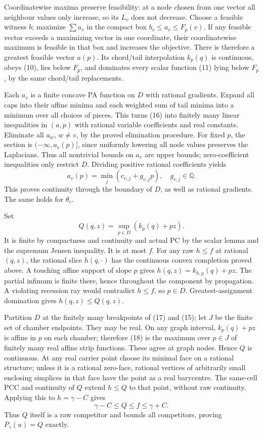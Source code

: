 \documentclass[
  11pt,
]{article}
\begin{document}
Coordinatewise maxima preserve feasibility: at a node chosen from one
vector all neighbour values only increase, so its \(L_v\) does not
decrease. Choose a feasible witness \(b\); maximize \(\sum a_v\) in the
compact box \(b_v\leq a_v\leq F_p(v)\). If any feasible vector exceeds a
maximizing vector in one coordinate, their coordinatewise maximum is
feasible in that box and increases the objective. There is therefore a
greatest feasible vector \(a(p)\). Its chord/tail interpolation
\(k_p(q)\) is continuous, obeys (10), lies below \(F_p\), and dominates
every scalar function (11) lying below \(F_p\), by the same chord/tail
replacements.

Each \(a_v\) is a finite concave PA function on \(D\) with rational
gradients. Expand all caps into their affine minima and each weighted
sum of tail minima into a minimum over all choices of pieces. This turns
(16) into finitely many linear inequalities in \((a,p)\) with rational
variable coefficients and real constants. Eliminate all \(a_w\),
\(w\ne v\), by the proved elimination procedure. For fixed \(p\), the
section is \((-\infty,a_v(p)]\), since uniformly lowering all node
values preserves the Laplacians. Thus all nontrivial bounds on \(a_v\)
are upper bounds; zero-coefficient inequalities only restrict \(D\).
Dividing positive rational coefficients yields \[
                       a_v(p)=\min_j(c_{v,j}+g_{v,j}p),\quad
                       g_{v,j}\in\mathbb{Q}.                 \tag{17}
\] This proves continuity through the boundary of \(D\), as well as
rational gradients. The same holds for \(\theta_e\).

Set \[
                            Q(q,z)=\sup_{p\in D}(k_p(q)+pz).             \tag{18}
\] It is finite by compactness and continuity and actual PC by the
scalar lemma and the supremum Jensen inequality. It is at most \(f\).
For any raw \(h\leq f\) at rational \((q,z)\), the rational slice
\(h(q,\cdot)\) has the continuous convex completion proved above. A
touching affine support of slope \(p\) gives \(h(q,z)=k_{h,p}(q)+pz\).
The partial infimum is finite there, hence throughout the component by
propagation. A violating recession ray would contradict \(h\leq f\), so
\(p\in D\). Greatest-assignment domination gives \(h(q,z)\leq Q(q,z)\).

Partition \(D\) at the finitely many breakpoints of (17) and (15); let
\(J\) be the finite set of chamber endpoints. They may be real. On any
graph interval, \(k_p(q)+pz\) is affine in \(p\) on each chamber;
therefore (18) is the maximum over \(p\in J\) of finitely many real
affine strip functions. These agree at graph nodes. Hence \(Q\) is
continuous. At any real carrier point choose its minimal face on a
rational structure; unless it is a rational zero-face, rational vertices
of arbitrarily small enclosing simplices in that face have the point as
a real barycentre. The same-cell PCC and continuity of \(Q\) extend
\(h\leq Q\) to that point, without raw continuity. Applying this to
\(h=\gamma-C\) gives \[
                         \gamma-C\leq Q\leq f\leq\gamma+C.              \tag{19}
\] Thus \(Q\) itself is a raw competitor and bounds all competitors,
proving \(P_\gamma(u)=Q\) exactly.
\end{document}
